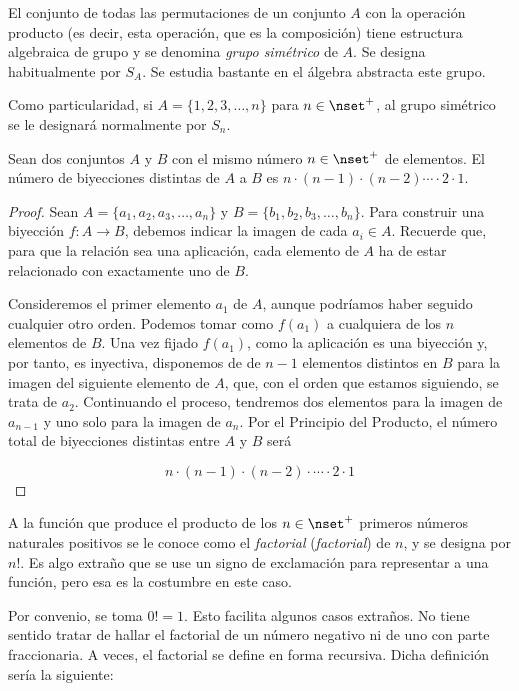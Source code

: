 El conjunto de todas las permutaciones de un conjunto $A$ con la operación
producto (es decir, esta operación, que es la composición) tiene estructura
algebraica de grupo y se denomina \emph{grupo simétrico} de $A$. Se designa
habitualmente por $S_A$. Se estudia bastante en el álgebra abstracta este
grupo.

Como particularidad, si $A = \{1, 2, 3, \ldots, n\}$  para $n \in
\nset^{+}$, al grupo simétrico se le designará normalmente por $S_n$.

\begin{theorem}
  Sean dos conjuntos $A$ y $B$ con el mismo número $n \in \nset^{+}$ de
  elementos. El número de biyecciones distintas de $A$ a $B$ es $n \cdot
  (n-1) \cdot (n-2) \cdots \cdot 2 \cdot 1$.
\end{theorem}

\begin{proof}
  Sean $A = \{a_1, a_2, a_3, \ldots, a_n\}$ y $B = \{b_1, b_2, b_3, \ldots,
  b_n\}$. Para construir una biyección $f: A \longrightarrow B$, debemos
  indicar la imagen de cada $a_i \in A$. Recuerde que, para que la relación
  sea una aplicación, cada elemento de $A$ ha de estar relacionado con
  exactamente uno de $B$.

  Consideremos el primer elemento $a_1$ de $A$, aunque podríamos haber
  seguido cualquier otro orden. Podemos tomar como $f(a_1)$ a cualquiera de
  los $n$ elementos de $B$. Una vez fijado $f(a_1)$, como la aplicación es
  una biyección y, por tanto, es inyectiva, disponemos de de $n-1$ elementos
  distintos en $B$ para la imagen del siguiente elemento de $A$, que, con el
  orden que estamos siguiendo, se trata de $a_2$. Continuando el proceso,
  tendremos dos elementos para la imagen de $a_{n-1}$ y uno solo para la
  imagen de $a_n$. Por el Principio del Producto, el número total de
  biyecciones distintas entre $A$ y $B$ será

  $$ n \cdot (n-1) \cdot (n-2) \cdot \cdots \cdot 2 \cdot 1 $$
\end{proof}

A la función que produce el producto de los $n \in \nset^{+}$ primeros
números naturales positivos se le conoce como el \emph{factorial}
(\emph{factorial}) de $n$, y se designa por $n!$. Es algo extraño que se use
un signo de exclamación para representar a una función, pero esa es la
costumbre en este caso.

Por convenio, se toma $0! = 1$. Esto facilita algunos casos extraños. No
tiene sentido tratar de hallar el factorial de un número negativo ni de uno
con parte fraccionaria. A veces, el factorial se define en forma recursiva.
Dicha definición sería la siguiente:

